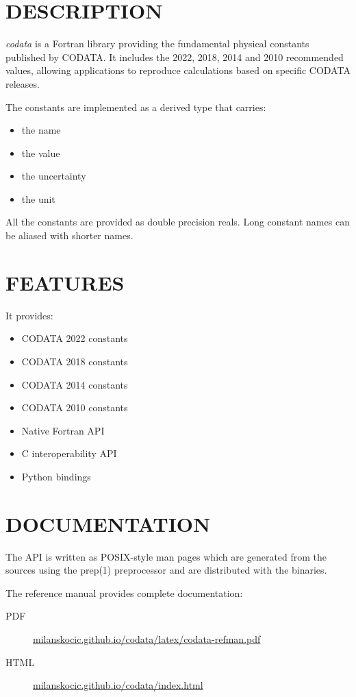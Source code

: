 \section*{DESCRIPTION}
\emph{codata} is a Fortran library providing the fundamental physical constants
published by CODATA. 
It includes the 2022, 2018, 2014 and 2010 recommended values, 
allowing applications to reproduce calculations based on specific 
CODATA releases.
  
The constants are implemented as a derived type that carries:
\begin{itemize}
\item the name
\item the value 
\item the uncertainty 
\item the unit
\end{itemize}
  
All the constants are provided as double precision reals.
Long constant names can be aliased with shorter names.

\section*{FEATURES}
It provides:
\begin{itemize}
\item CODATA 2022 constants
\item CODATA 2018 constants
\item CODATA 2014 constants
\item CODATA 2010 constants
\item Native Fortran API
\item C interoperability API
\item Python bindings
\end{itemize}

\section*{DOCUMENTATION }
The API is written as POSIX-style man pages which are generated from the
sources using the prep(1) preprocessor and are distributed with the binaries. 
  
The reference manual provides complete documentation:
\begin{description}
\item[PDF] \href{https://milanskocic.github.io/codata/latex/codata-refman.pdf}{milanskocic.github.io/codata/latex/codata-refman.pdf} 
\item[HTML] \href{https://milanskocic.github.io/codata/index.html}{milanskocic.github.io/codata/index.html} 
\end{description}
  

